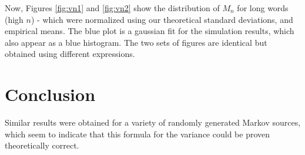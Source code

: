 
\pagebreak
Now, Figures \ref{fig:vn1} and \ref{fig:vn2} show the distribution of $M_n$ 
for long words (high $n$) - which were normalized using 
our theoretical standard deviations, and empirical means. The blue plot is 
a gaussian fit for the simulation results, which also appear as a blue histogram.
The two sets of figures are identical but obtained using different expressions.




\section{Conclusion}
Similar results were obtained for a variety of randomly generated Markov sources,
which seem to indicate that this formula for the variance could be proven theoretically
correct. 

